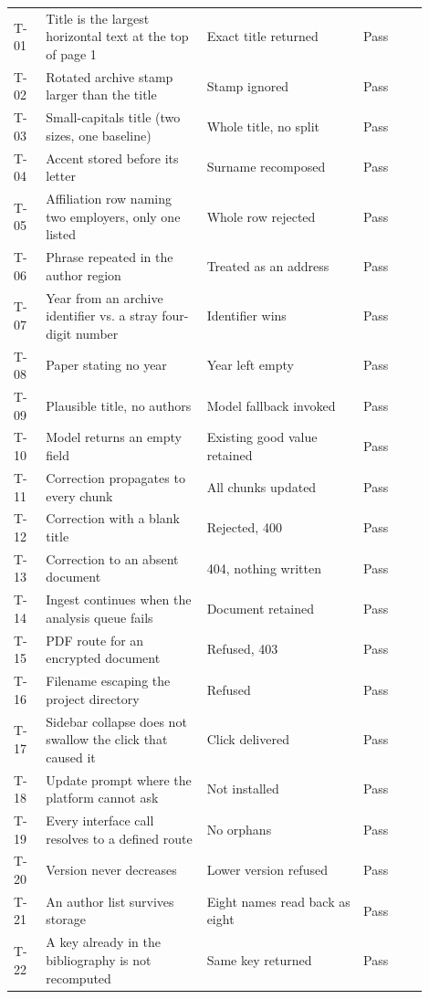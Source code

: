 \documentclass[12pt,a4paper]{report}
\begin{document}
\begin{longtable}{@{}p{0.07\linewidth}p{0.35\linewidth}p{0.34\linewidth}p{0.14\linewidth}@{}}
T-01 & Title is the largest horizontal text at the top of page 1 & Exact title
  returned & Pass \\
T-02 & Rotated archive stamp larger than the title & Stamp ignored & Pass \\
T-03 & Small-capitals title (two sizes, one baseline) & Whole title, no split
  & Pass \\
T-04 & Accent stored before its letter & Surname recomposed & Pass \\
T-05 & Affiliation row naming two employers, only one listed & Whole row
  rejected & Pass \\
T-06 & Phrase repeated in the author region & Treated as an address & Pass \\
T-07 & Year from an archive identifier vs. a stray four-digit number & Identifier
  wins & Pass \\
T-08 & Paper stating no year & Year left empty & Pass \\
T-09 & Plausible title, no authors & Model fallback invoked & Pass \\
T-10 & Model returns an empty field & Existing good value retained & Pass \\
T-11 & Correction propagates to every chunk & All chunks updated & Pass \\
T-12 & Correction with a blank title & Rejected, 400 & Pass \\
T-13 & Correction to an absent document & 404, nothing written & Pass \\
T-14 & Ingest continues when the analysis queue fails & Document retained
  & Pass \\
T-15 & PDF route for an encrypted document & Refused, 403 & Pass \\
T-16 & Filename escaping the project directory & Refused & Pass \\
T-17 & Sidebar collapse does not swallow the click that caused it & Click
  delivered & Pass \\
T-18 & Update prompt where the platform cannot ask & Not installed & Pass \\
T-19 & Every interface call resolves to a defined route & No orphans & Pass \\
T-20 & Version never decreases & Lower version refused & Pass \\
T-21 & An author list survives storage & Eight names read back as eight
  & Pass \\
T-22 & A key already in the bibliography is not recomputed & Same key returned
  & Pass \\

\end{longtable}
\end{document}
